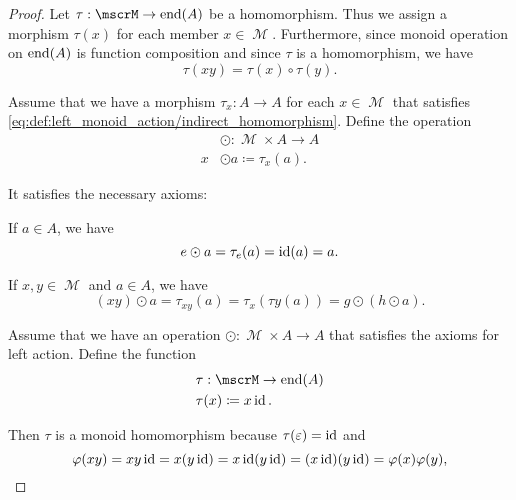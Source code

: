 \begin{proof}
   Let \( \tau: \mscrM \to \End(A) \) be a homomorphism. Thus we assign a morphism \( \tau(x) \) for each member \( x \in \mscrM \). Furthermore, since monoid operation on \( \operatorname{end}(A) \) is function composition and since \( \tau \) is a homomorphism, we have
  \begin{equation*}
    \tau(xy) = \tau(x) \circ \tau(y).
  \end{equation*}

   Assume that we have a morphism \( \tau_x: A \to A \) for each \( x \in \mscrM \) that satisfies \eqref{eq:def:left_monoid_action/indirect_homomorphism}. Define the operation
  \begin{align*}
    {}&\odot{}: \mscrM \times A \to A \\
    x &\odot a \coloneqq \tau_x(a).
  \end{align*}

  It satisfies the necessary axioms:
  \begin{RefList}
     If \( a \in A \), we have
    \begin{equation*}
      e \odot a
      =
      \tau_e(a)
      =
      \operatorname{id}(a)
      =
      a.
    \end{equation*}

     If \( x, y \in \mscrM \) and \( a \in A \), we have
    \begin{equation*}
      (x y) \odot a
      =
      \tau_{x y}(a)
      =
      \tau_{x}(\tau{y}(a))
      =
      g \odot (h \odot a).
    \end{equation*}
  \end{RefList}

   Assume that we have an operation \( \odot: \mscrM \times A \to A \) that satisfies the axioms for left action. Define the function
  \begin{align*}
    &\tau: \mscrM \to \End(A) \\
    &\tau(x) \coloneqq x \Id.
  \end{align*}

  Then \( \tau \) is a monoid homomorphism because \( \tau(\varepsilon) = \operatorname{id} \) and
  \begin{equation}\label{def:left_monoid_action/homomorphism/proof}
    \varphi(xy)
    =
    xy \operatorname{id}
    =
    x (y \operatorname{id})
    =
    x \operatorname{id} (y \operatorname{id})
    =
    (x \operatorname{id}) (y \operatorname{id})
    =
    \varphi(x) \varphi(y),
  \end{equation}
\end{proof}

